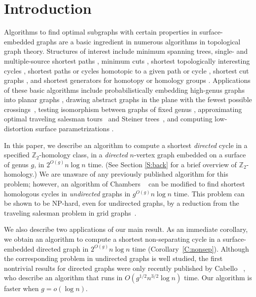 \documentclass[twoside,leqno,twocolumn]{article}
\def\Z{\mathbb{Z}}
\begin{document}
\section{Introduction}

Algorithms to find optimal subgraphs with certain properties in surface-embedded graphs are a basic ingredient in numerous algorithms in topological graph theory.  Structures of interest include minimum spanning trees, single- and multiple-source shortest paths \cite{cc-msspg-07, multishort, hkrs-fspap-97, k-msspp-05}, minimum cuts \cite{surfcut, surflow}, shortest topologically interesting cycles \cite{c-mdpg-06, multishort, ccl-fsncd-10, schema, k-csnco-06, t-egnsn-90}, shortest paths or cycles homotopic to a given path or cycle \cite{cl-opdsh-07, octagons, hs-cmlpg-94}, shortest cut graphs \cite{c-scgsp-10, schema, gohog}, and shortest generators for homotopy or homology groups \cite{dls-chtl-07, gohog}.  Applications of these basic algorithms include probabilistically embedding high-genus graphs into planar graphs \cite{bls-rrgh-09,ls-ggcg-10,s-osp-10}, drawing abstract graphs in the plane with the fewest possible crossings~\cite{kr-ccnlt-07}, testing isomorphism between graphs of fixed genus \cite{km-gmiap-08}, approximating optimal traveling salesman tours~\cite{dhm-aacd-07} and Steiner trees~\cite{bdt-ptass-08, bkk-ptass-07, bkk-stpg-07}, and computing low-distortion surface parametrizations \cite{ssp-cetm-08, tacd-dqdhf-06}.

In this paper, we describe an algorithm to compute a shortest \emph{directed} cycle in a specified $\Z_2$-homology class, in a \emph{directed} $n$-vertex graph embedded on a surface of genus $g$, in $2^{O(g)}n\log n$ time.  (See Section \ref{S:back} for a brief overview of $\Z_2$-homology.)   We are unaware of any previously published algorithm for this problem; however, an algorithm of Chambers \etal~\cite{splitting} can be modified to find shortest homologous cycles in \emph{undirected} graphs in $g^{O(g)} n\log n$ time.  This problem can be shown to be {NP}-hard, even for undirected graphs, by a reduction from the traveling salesman problem in grid graphs~\cite{splitting}.

We also describe two applications of our main result.  As an immediate corollary, we obtain an algorithm to compute a shortest non-separating cycle in a surface-embedded directed graph in $2^{O(g)} n\log n$ time (Corollary~\ref{C:nonsep}).  Although the corresponding problem in undirected graphs is well studied, the first nontrivial results for directed graphs were only recently published by Cabello \etal~\cite{ccl-fsncd-10}, who describe an algorithm that runs in $O(g^{1/2} n^{3/2}\log n)$ time.  Our algorithm is faster when $g=o(\log n)$.
\end{document}

